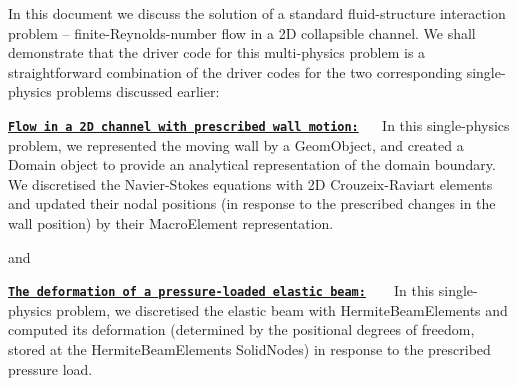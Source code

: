 In this document we discuss the solution of a standard fluid-\/structure interaction problem -- finite-\/\+Reynolds-\/number flow in a 2D collapsible channel. We shall demonstrate that the driver code for this multi-\/physics problem is a straightforward combination of the driver codes for the two corresponding single-\/physics problems discussed earlier\+:
\begin{DoxyItemize}
\item {\bfseries \href{../../../navier_stokes/collapsible_channel/html/index.html}{\tt Flow in a 2D channel with prescribed wall motion\+:}}~\newline
~\newline
 In this single-\/physics problem, we represented the moving wall by a {\ttfamily Geom\+Object}, and created a {\ttfamily Domain} object to provide an analytical representation of the domain boundary. We discretised the Navier-\/\+Stokes equations with 2D Crouzeix-\/\+Raviart elements and updated their nodal positions (in response to the prescribed changes in the wall position) by their {\ttfamily Macro\+Element} representation.
\end{DoxyItemize}and
\begin{DoxyItemize}
\item {\bfseries \href{../../../beam/tensioned_string/html/index.html}{\tt The deformation of a pressure-\/loaded elastic beam\+:}} ~\newline
~\newline
 In this single-\/physics problem, we discretised the elastic beam with {\ttfamily Hermite\+Beam\+Elements} and computed its deformation (determined by the positional degrees of freedom, stored at the {\ttfamily Hermite\+Beam\+Element\textquotesingle{}s} {\ttfamily Solid\+Nodes}) in response to the prescribed pressure load.
\end{DoxyItemize}



 

